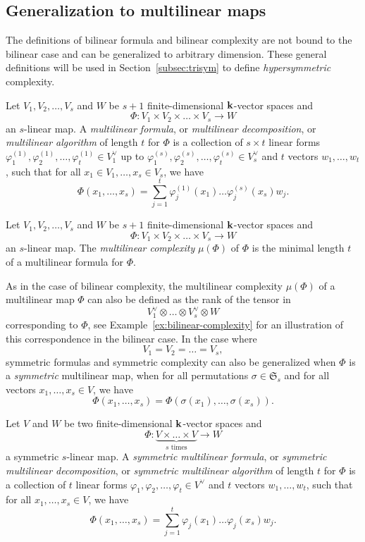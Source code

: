 \subsection{Generalization to multilinear maps}
The definitions of bilinear formula and bilinear complexity are not bound to the
bilinear case and can be generalized to arbitrary dimension. These general
definitions will be used in Section~\ref{subsec:trisym} to define
\emph{hypersymmetric} complexity.
\begin{defi}
Let $V_1, V_2, \dots, V_s$ and $W$ be $s+1$ finite-dimensional $\mathbf{k}$-vector
spaces and
\[
  \Phi:V_1\times V_2\times\dots\times V_s\to W
\]
an $s$-linear map. A \emph{multilinear formula}, or \emph{multilinear
decomposition}, or \emph{multilinear algorithm} of length $t$ for $\Phi$ is a
collection of $s\times t$ linear forms $\varphi_1^{(1)}, \varphi_2^{(1)}, \dots,
\varphi_t^{(1)}\in V_1^\vee$ up to $\varphi_1^{(s)}, \varphi_2^{(s)}, \dots,
\varphi_t^{(s)}\in V_s^{\vee}$ and $t$ vectors $w_1, \dots, w_t$, such that for all $x_1\in V_1, \dots, x_s\in
V_s$, we have
\[
  \Phi(x_1, \dots, x_s) =
  \sum_{j=1}^t\varphi_j^{(1)}(x_1)\dots\varphi_j^{(s)}(x_s)w_j.
\]
\end{defi}
\begin{defi}
Let $V_1, V_2, \dots, V_s$ and $W$ be $s+1$ finite-dimensional $\mathbf{k}$-vector
spaces and
\[
  \Phi:V_1\times V_2\times\dots\times V_s\to W
\]
an $s$-linear map. The \emph{multilinear complexity} $\mu(\Phi)$ of $\Phi$ is the
minimal length $t$ of a multilinear formula for $\Phi$.
\end{defi}
As in the case of bilinear complexity, the multilinear complexity $\mu(\Phi)$ of a
multilinear map $\Phi$ can also be defined as the rank of the tensor in 
\[
  V_1^\vee\otimes\dots\otimes V_s^\vee\otimes W
\]
corresponding to $\Phi$, see Example~\ref{ex:bilinear-complexity} for an
illustration of this correspondence in the bilinear case. In the case where
\[
  V_1 = V_2 = \dots = V_s,
\]
symmetric formulas and
symmetric complexity can also be generalized when $\Phi$ is a \emph{symmetric}
multilinear map, \ie when for all permutations $\sigma\in\mathfrak S_s$ and for
all vectors $x_1, \dots, x_s\in V$, we have
\[
  \Phi(x_1, \dots, x_s) = \Phi(\sigma(x_1), \dots, \sigma(x_s)).
\]
\begin{defi}
Let $V$ and $W$ be two finite-dimensional $\mathbf{k}$-vector
spaces and
\[
  \Phi:\underset{\textrm{$s$ times}}{\underbrace{V\times\dots\times V}}\to W
\]
a symmetric $s$-linear map. A \emph{symmetric multilinear formula}, or
\emph{symmetric multilinear
decomposition}, or \emph{symmetric multilinear algorithm} of length $t$ for $\Phi$ is a
collection of $t$ linear forms $\varphi_1, \varphi_2, \dots,
\varphi_t\in V^\vee$ and $t$ vectors $w_1, \dots, w_t$, such that for all $x_1, \dots, x_s\in
V$, we have
\[
  \Phi(x_1, \dots, x_s) =
  \sum_{j=1}^t\varphi_j(x_1)\dots\varphi_j(x_s)w_j.
\]
\end{defi}
